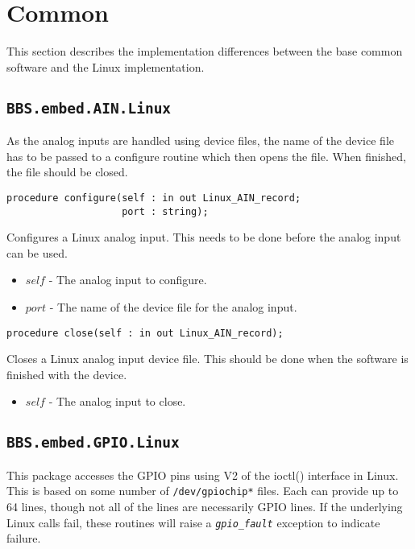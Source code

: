 \documentclass[10pt, openany]{book}
\newcommand{\indexfunc}[1]{\index[func]{#1}}
\newcommand{\package}[1]{\texttt{#1}}
\newcommand{\constant}[1]{\emph{\texttt{#1}}}
\newcommand{\filename}[1]{\texttt{#1}}
\begin{document}
\section{Common}
This section describes the implementation differences between the base common software and the Linux implementation.

\subsection{\package{BBS.embed.AIN.Linux}}
As the analog inputs are handled using device files, the name of the device file has to be passed to a configure routine which then opens the file.  When finished, the file should be closed.

\begin{lstlisting}
procedure configure(self : in out Linux_AIN_record;
                    port : string);
\end{lstlisting}
\indexfunc{configure}
Configures a Linux analog input.  This needs to be done before the analog input can be used.
\begin{itemize}
  \item $self$ - The analog input to configure.
  \item $port$ - The name of the device file for the analog input.
\end{itemize}

\begin{lstlisting}
procedure close(self : in out Linux_AIN_record);
\end{lstlisting}
\indexfunc{close}
Closes a Linux analog input device file.  This should be done when the software is finished with the device.
\begin{itemize}
  \item $self$ - The analog input to close.
\end{itemize}

\subsection{\package{BBS.embed.GPIO.Linux}}
This package accesses the GPIO pins using V2 of the ioctl() interface in Linux.  This is based on some number of \filename{/dev/gpiochip*} files.  Each can provide up to 64 lines, though not all of the lines are necessarily GPIO lines.  If the underlying Linux calls fail, these routines will raise a \constant{gpio\_fault} exception to indicate failure.
\end{document}
